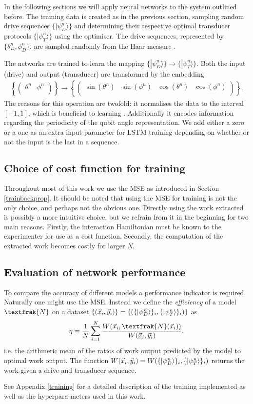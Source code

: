 In the following sections we will apply neural networks to the system outlined before.
The training data is created as in the previous section, sampling random drive sequences $\{|\psi_D^n \rangle\}$ and determining their respective optimal transducer protocols $\{|\psi_T^n \rangle\}$ using the optimiser.
The drive sequences, represented by $\{\theta_D^n, \phi_D^n\}$, are sampled randomly from the Haar measure \cite{Mezzadri}.

The networks are trained to learn the mapping $\{|\psi_D^n \rangle\} \to \{|\psi_T^n \rangle\}$.
Both the input (drive) and output (transducer) are transformed by the embedding
\begin{align} \label{embedding}
	\left\{
	\begin{pmatrix}
	\theta^n & \phi^n \\
	\end{pmatrix}
	\right\}
	\to
	\left\{
	\begin{pmatrix}
	\sin(\theta^n) & \sin(\phi^n) & \cos(\theta^n)  & \cos(\phi^n) \\
	\end{pmatrix}
	\right\}.
\end{align}
The reasons for this operation are twofold: it normalises the data to the interval $[-1, 1]$, which is beneficial to learning \cite{LeCun2012}. Additionally it encodes information regarding the periodicity of the qubit angle representation.
We add either a zero or a one as an extra input parameter for LSTM training depending on whether or not the input is the last in a sequence.

\subsection{Choice of cost function for training}
Throughout most of this work we use the MSE as introduced in Section \ref{trainbackprop}.
It should be noted that using the MSE for training is not the only choice, and perhaps not the obvious one.
Directly using the work extracted is possibly a more intuitive choice, but we refrain from it in the beginning for two main reasons.
Firstly, the interaction Hamiltonian must be known to the experimenter for use as a cost function.
Secondly, the computation of the extracted work becomes costly for larger $N$.

\subsection{Evaluation of network performance}
To compare the accuracy of different models a performance indicator is required. 
Naturally one might use the MSE.
Instead we define the \textit{efficiency} of a model $\textfrak{N}$ on a dataset $\{(\vec{x}_i, \vec{y}_i)\} = \{(\{\ket{\psi_D^n}\}_i, \{\ket{\psi_T^n}\}_i) \}$ as
\begin{align}
	\eta = \frac{1}{N} \sum_{i=1}^N \frac{W(\vec{x}_i,\textfrak{N}(\vec{x}_i))}{W(\vec{x}_i,\vec{y}_i)},
\end{align}
i.e. the arithmetic mean of the ratios of work output predicted by the model to optimal work output.
The function $W(\vec{x}_i, \vec{y}_i) = W(\{\ket{\psi_D^n}\}_i, \{\ket{\psi_T^n}\}_i)$ returns the work given a drive and transducer sequence.

See Appendix \ref{training} for a detailed description of the training implemented as well as the hyperpara-meters used in this work.